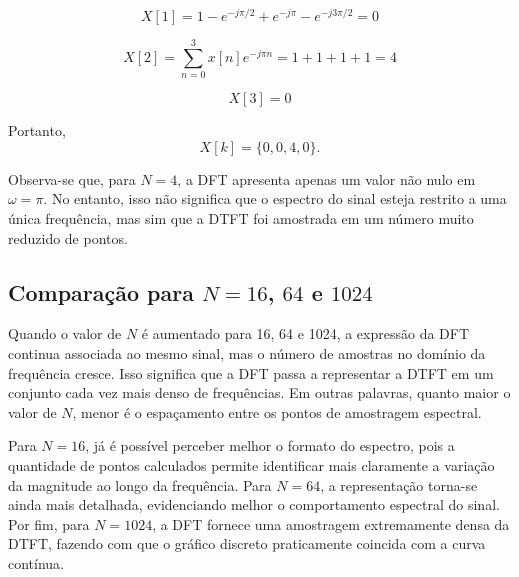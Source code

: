 \documentclass[12pt,a4paper]{article}
\begin{document}
\[
X[1]=1-e^{-j\pi/2}+e^{-j\pi}-e^{-j3\pi/2}=0
\]

\[
X[2]=\sum_{n=0}^{3}x[n]e^{-j\pi n}=1+1+1+1=4
\]

\[
X[3]=0
\]

Portanto,
\[
X[k]=\{0,0,4,0\}.
\]

Observa-se que, para \(N=4\), a DFT apresenta apenas um valor não nulo em \(\omega=\pi\). No entanto, isso não significa que o espectro do sinal esteja restrito a uma única frequência, mas sim que a DTFT foi amostrada em um número muito reduzido de pontos.

\subsection{Comparação para \(N=16\), \(64\) e \(1024\)}

Quando o valor de \(N\) é aumentado para 16, 64 e 1024, a expressão da DFT continua associada ao mesmo sinal, mas o número de amostras no domínio da frequência cresce. Isso significa que a DFT passa a representar a DTFT em um conjunto cada vez mais denso de frequências. Em outras palavras, quanto maior o valor de \(N\), menor é o espaçamento entre os pontos de amostragem espectral.

Para \(N=16\), já é possível perceber melhor o formato do espectro, pois a quantidade de pontos calculados permite identificar mais claramente a variação da magnitude ao longo da frequência. Para \(N=64\), a representação torna-se ainda mais detalhada, evidenciando melhor o comportamento espectral do sinal. Por fim, para \(N=1024\), a DFT fornece uma amostragem extremamente densa da DTFT, fazendo com que o gráfico discreto praticamente coincida com a curva contínua.
\end{document}
